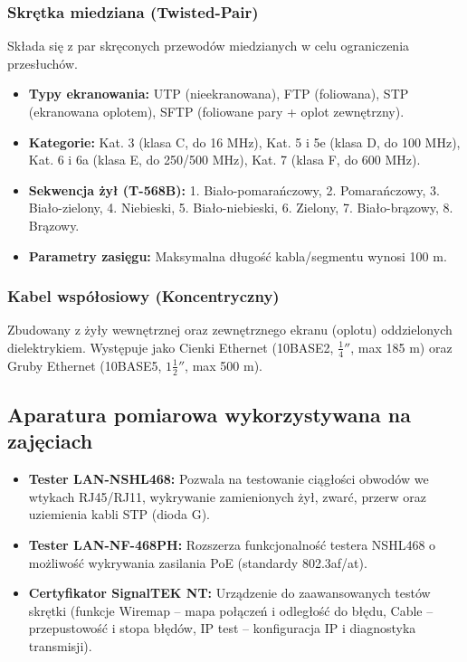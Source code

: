 \documentclass[11pt,a4paper]{article}
\begin{document}
\subsubsection{Skrętka miedziana (Twisted-Pair)}
Składa się z par skręconych przewodów miedzianych w celu ograniczenia przesłuchów.
\begin{itemize}[noitemsep]
    \item \textbf{Typy ekranowania:} UTP (nieekranowana), FTP (foliowana), STP (ekranowana oplotem), SFTP (foliowane pary + oplot zewnętrzny).
    \item \textbf{Kategorie:} Kat. 3 (klasa C, do 16 MHz), Kat. 5 i 5e (klasa D, do 100 MHz), Kat. 6 i 6a (klasa E, do 250/500 MHz), Kat. 7 (klasa F, do 600 MHz).
    \item \textbf{Sekwencja żył (T-568B):} 1. Biało-pomarańczowy, 2. Pomarańczowy, 3. Biało-zielony, 4. Niebieski, 5. Biało-niebieski, 6. Zielony, 7. Biało-brązowy, 8. Brązowy.
    \item \textbf{Parametry zasięgu:} Maksymalna długość kabla/segmentu wynosi 100 m.
\end{itemize}

\subsubsection{Kabel współosiowy (Koncentryczny)}
Zbudowany z żyły wewnętrznej oraz zewnętrznego ekranu (oplotu) oddzielonych dielektrykiem. Występuje jako Cienki Ethernet (10BASE2, $\frac{1}{4}''$, max 185 m) oraz Gruby Ethernet (10BASE5, $1\frac{1}{2}''$, max 500 m).

\subsection{Aparatura pomiarowa wykorzystywana na zajęciach}
\begin{itemize}[noitemsep]
    \item \textbf{Tester LAN-NSHL468:} Pozwala na testowanie ciągłości obwodów we wtykach RJ45/RJ11, wykrywanie zamienionych żył, zwarć, przerw oraz uziemienia kabli STP (dioda G).
    \item \textbf{Tester LAN-NF-468PH:} Rozszerza funkcjonalność testera NSHL468 o możliwość wykrywania zasilania PoE (standardy 802.3af/at).
    \item \textbf{Certyfikator SignalTEK NT:} Urządzenie do zaawansowanych testów skrętki (funkcje Wiremap -- mapa połączeń i odległość do błędu, Cable -- przepustowość i stopa błędów, IP test -- konfiguracja IP i diagnostyka transmisji).
\end{itemize}
\end{document}

